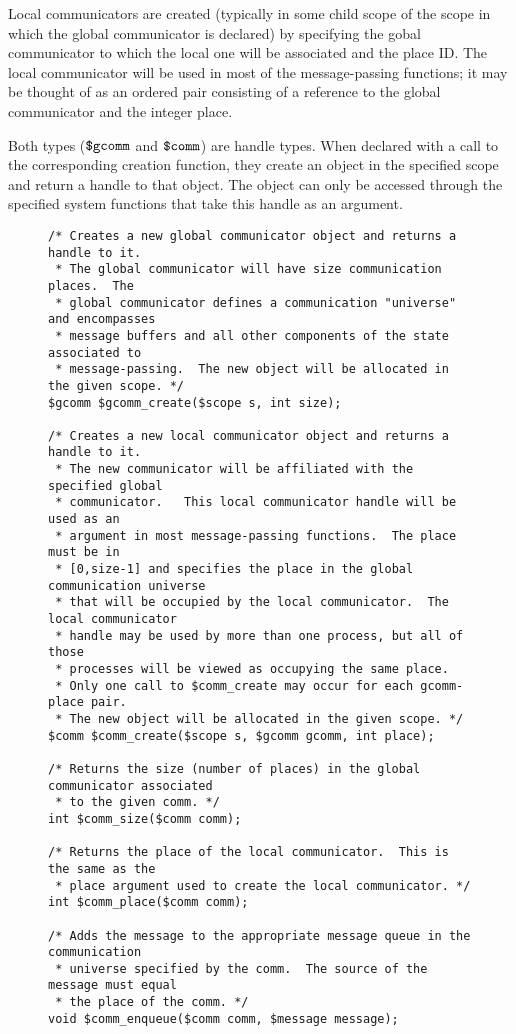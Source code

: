 Local communicators are created (typically in some child scope of the
scope in which the global communicator is declared) by specifying the
gobal communicator to which the local one will be associated and the
place ID. The local communicator will be used in most of the
message-passing functions; it may be thought of as an ordered pair
consisting of a reference to the global communicator and the integer
place.

Both types ($\mbox{\texttt{\${}gcomm}}$ and $\mbox{\texttt{\${}comm}}$) are handle types. When declared
with a call to the corresponding creation function, they create an
object in the specified scope and return a handle to that object. The
object can only be accessed through the specified system functions
that take this handle as an argument.

\begin{figure}
  \begin{small}
\begin{verbatim}
/* Creates a new global communicator object and returns a handle to it.
 * The global communicator will have size communication places.  The
 * global communicator defines a communication "universe" and encompasses
 * message buffers and all other components of the state associated to
 * message-passing.  The new object will be allocated in the given scope. */
$gcomm $gcomm_create($scope s, int size);

/* Creates a new local communicator object and returns a handle to it.
 * The new communicator will be affiliated with the specified global
 * communicator.   This local communicator handle will be used as an
 * argument in most message-passing functions.  The place must be in
 * [0,size-1] and specifies the place in the global communication universe
 * that will be occupied by the local communicator.  The local communicator
 * handle may be used by more than one process, but all of those
 * processes will be viewed as occupying the same place.
 * Only one call to $comm_create may occur for each gcomm-place pair.
 * The new object will be allocated in the given scope. */
$comm $comm_create($scope s, $gcomm gcomm, int place);

/* Returns the size (number of places) in the global communicator associated
 * to the given comm. */
int $comm_size($comm comm);

/* Returns the place of the local communicator.  This is the same as the
 * place argument used to create the local communicator. */
int $comm_place($comm comm);

/* Adds the message to the appropriate message queue in the communication
 * universe specified by the comm.  The source of the message must equal
 * the place of the comm. */
void $comm_enqueue($comm comm, $message message);


\end{verbatim}
\end{small}
\end{figure}
